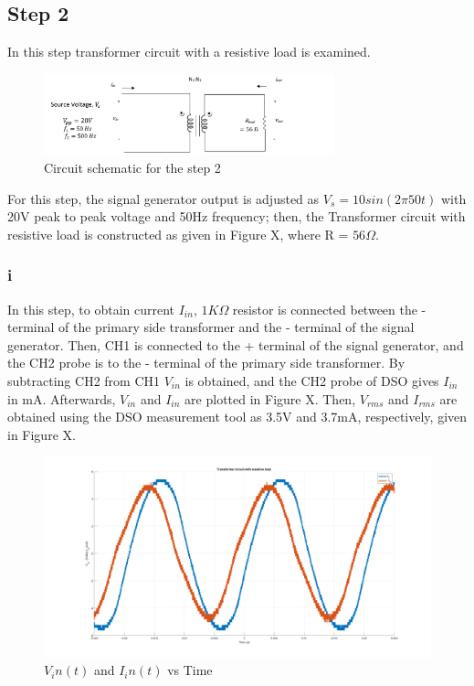 \documentclass[letterpaper,12pt]{article}
\begin{document}
%

%
\subsection{Step 2}
In this step transformer circuit with a resistive load is examined.
\begin{figure}[H]
    \centering
    \includegraphics[width = 0.75\textwidth]{2.png}
    \caption{Circuit schematic for the step 2}
\end{figure} 


For this step, the signal generator output is adjusted as \(V_s = 10sin(2\pi50t)\) with 20V peak to peak voltage and 50Hz frequency; then, the Transformer circuit with resistive load is constructed as given in Figure X, where R = \(56\Omega \).  
\subsubsection{i}
In this step, to obtain current \(I_{in}\), \(1K\Omega \) resistor is connected between the - terminal of the primary side transformer and the - terminal of the signal generator. Then, CH1 is connected to the + terminal of the signal generator, and the CH2 probe is to the - terminal of the primary side transformer. By subtracting CH2 from CH1 \(V_{in}\) is obtained, and the CH2 probe of DSO gives \(I_{in}\) in mA. Afterwards, \(V_{in}\) and \(I_{in}\) are plotted in Figure X. Then, \(V_{rms}\) and \(I_{rms}\) are obtained using the DSO measurement tool as 3.5V and 3.7mA, respectively, given in Figure X.

\begin{figure}[H]
    \centering
    \includegraphics[width = 1\textwidth]{2_1.png}
    \caption{\(V_in(t) \) and \(I_in(t)\) vs Time}
\end{figure} 
\end{document}
